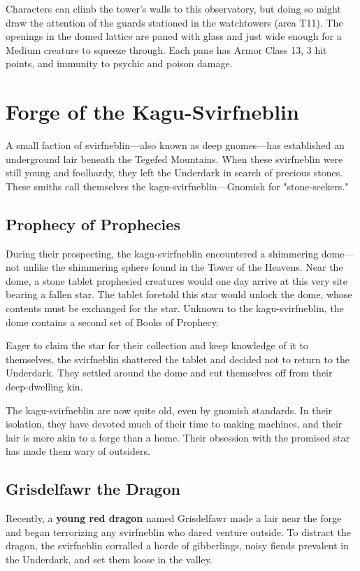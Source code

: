 \documentclass[10pt,a4paper,twoside,bg=print,twocolumn,openany,nodeprecatedcode]{dndbook}
\begin{document}
Characters can climb the tower's walls to this observatory, but doing so might draw the attention of the guards stationed in the watchtowers (area T11). The openings in the domed lattice are paned with glass and just wide enough for a Medium creature to squeeze through. Each pane has Armor Class 13, 3 hit points, and immunity to psychic and poison damage.

\section{Forge of the Kagu-Svirfneblin}
A small faction of svirfneblin—also known as deep gnomes—has established an underground lair beneath the Tegefed Mountains. When these svirfneblin were still young and foolhardy, they left the Underdark in search of precious stones. These smiths call themselves the kagu-svirfneblin—Gnomish for "stone-seekers."

\subsection{Prophecy of Prophecies}
During their prospecting, the kagu-svirfneblin encountered a shimmering dome—not unlike the shimmering sphere found in the Tower of the Heavens. Near the dome, a stone tablet prophesied creatures would one day arrive at this very site bearing a fallen star. The tablet foretold this star would unlock the dome, whose contents must be exchanged for the star. Unknown to the kagu-svirfneblin, the dome contains a second set of Books of Prophecy.

Eager to claim the star for their collection and keep knowledge of it to themselves, the svirfneblin shattered the tablet and decided not to return to the Underdark. They settled around the dome and cut themselves off from their deep-dwelling kin.

The kagu-svirfneblin are now quite old, even by gnomish standards. In their isolation, they have devoted much of their time to making machines, and their lair is more akin to a forge than a home. Their obsession with the promised star has made them wary of outsiders.

\subsection{Grisdelfawr the Dragon}
Recently, a \textbf{young red dragon} named Grisdelfawr made a lair near the forge and began terrorizing any svirfneblin who dared venture outside. To distract the dragon, the svirfneblin corralled a horde of gibberlings, noisy fiends prevalent in the Underdark, and set them loose in the valley.
\end{document}
